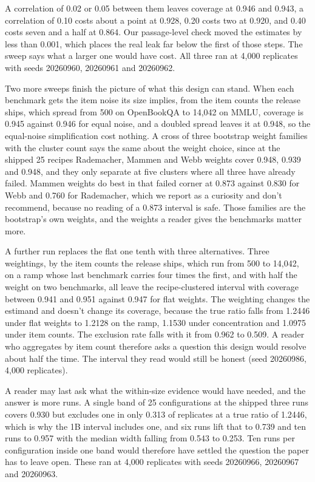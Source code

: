 A correlation of 0.02 or 0.05 between them leaves coverage at 0.946 and 0.943, a correlation of 0.10 costs about a point at 0.928, 0.20 costs two at 0.920, and 0.40 costs seven and a half at 0.864. Our passage-level check moved the estimates by less than 0.001, which places the real leak far below the first of those steps. The sweep says what a larger one would have cost. All three ran at 4,000 replicates with seeds 20260960, 20260961 and 20260962.

Two more sweeps finish the picture of what this design can stand. When each benchmark gets the item noise its size implies, from the item counts the release ships, which spread from 500 on OpenBookQA to 14,042 on MMLU, coverage is 0.945 against 0.946 for equal noise, and a doubled spread leaves it at 0.948, so the equal-noise simplification cost nothing. A cross of three bootstrap weight families with the cluster count says the same about the weight choice, since at the shipped 25 recipes Rademacher, Mammen and Webb weights cover 0.948, 0.939 and 0.948, and they only separate at five clusters where all three have already failed. Mammen weights do best in that failed corner at 0.873 against 0.830 for Webb and 0.760 for Rademacher, which we report as a curiosity and don't recommend, because no reading of a 0.873 interval is safe. Those families are the bootstrap's own weights, and the weights a reader gives the benchmarks matter more.

A further run replaces the flat one tenth with three alternatives. Three weightings, by the item counts the release ships, which run from 500 to 14,042, on a ramp whose last benchmark carries four times the first, and with half the weight on two benchmarks, all leave the recipe-clustered interval with coverage between 0.941 and 0.951 against 0.947 for flat weights. The weighting changes the estimand and doesn't change its coverage, because the true ratio falls from 1.2446 under flat weights to 1.2128 on the ramp, 1.1530 under concentration and 1.0975 under item counts. The exclusion rate falls with it from 0.962 to 0.509. A reader who aggregates by item count therefore asks a question this design would resolve about half the time. The interval they read would still be honest (seed 20260986, 4,000 replicates).

A reader may last ask what the within-size evidence would have needed, and the answer is more runs. A single band of 25 configurations at the shipped three runs covers 0.930 but excludes one in only 0.313 of replicates at a true ratio of 1.2446, which is why the 1B interval includes one, and six runs lift that to 0.739 and ten runs to 0.957 with the median width falling from 0.543 to 0.253. Ten runs per configuration inside one band would therefore have settled the question the paper has to leave open. These ran at 4,000 replicates with seeds 20260966, 20260967 and 20260963.

